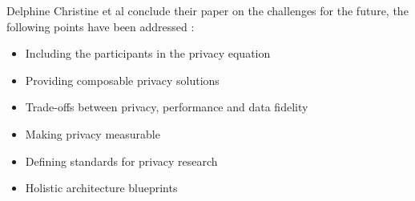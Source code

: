 Delphine Christine et al \cite{christin2016privacy} conclude their paper on the challenges for the future, the following points have been addressed \cite{pournarasethical}:

\begin{itemize}
\item Including the participants in the privacy equation
\item Providing composable privacy solutions
\item Trade-offs between privacy, performance and data fidelity
\item Making privacy measurable
\item Defining standards for privacy research
\item Holistic architecture blueprints
\end{itemize}



